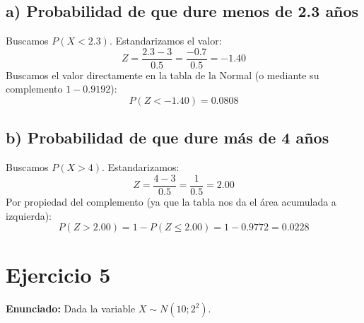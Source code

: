 \documentclass[11pt, a4paper]{article}
\begin{document}
\subsection*{a) Probabilidad de que dure menos de 2.3 años}
Buscamos $P(X < 2.3)$. Estandarizamos el valor:
\begin{equation*}
Z = \frac{2.3 - 3}{0.5} = \frac{-0.7}{0.5} = -1.40
\end{equation*}
Buscamos el valor directamente en la tabla de la Normal (o mediante su complemento $1 - 0.9192$):
\begin{equation*}
P(Z < -1.40) = 0.0808
\end{equation*}
\begin{center}
\end{center}

\subsection*{b) Probabilidad de que dure más de 4 años}
Buscamos $P(X > 4)$. Estandarizamos:
\begin{equation*}
Z = \frac{4 - 3}{0.5} = \frac{1}{0.5} = 2.00
\end{equation*}
Por propiedad del complemento (ya que la tabla nos da el área acumulada a izquierda):
\begin{equation*}
P(Z > 2.00) = 1 - P(Z \le 2.00) = 1 - 0.9772 = 0.0228
\end{equation*}
\begin{center}
\end{center}


\section*{Ejercicio 5}
\textbf{Enunciado:} Dada la variable $X \sim N(10; 2^2)$.
\end{document}
